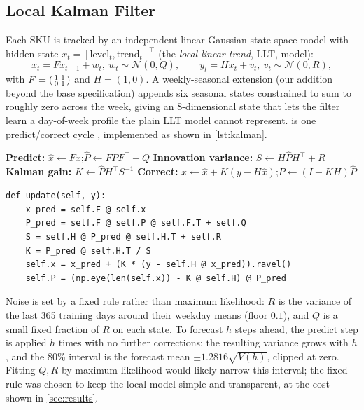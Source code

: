 \documentclass[conference]{IEEEtran}
\begin{document}
\subsection{Local Kalman Filter}
\label{sec:kalman}
Each SKU is tracked by an independent linear-Gaussian state-space model with hidden state
$x_t=[\text{level}_t,\text{trend}_t]^\top$ (the \emph{local linear trend}, LLT, model):
\begin{equation}
  x_t = F x_{t-1} + w_t,\ w_t\sim\mathcal{N}(0,Q), \qquad
  y_t = H x_t + v_t,\ v_t\sim\mathcal{N}(0,R),
  \label{eq:ssm}
\end{equation}
with $F=\begin{psmallmatrix}1&1\\0&1\end{psmallmatrix}$ and $H=(1,0)$. A weekly-seasonal extension
(our addition beyond the base specification) appends six seasonal states constrained to sum to
roughly zero across the week, giving an 8-dimensional state that lets the filter learn a
day-of-week profile the plain LLT model cannot represent.  is one predict/correct
cycle \cite{kalman1960}, implemented as shown in \cref{lst:kalman}.

\begin{algorithm}[t]
\caption{Kalman filter, one time step}
\label{alg:kalman}
\footnotesize
\begin{algorithmic}[1]
\State \textbf{Predict:} $\hat{x}\gets Fx$;\quad $\hat{P}\gets FPF^\top+Q$
\State \textbf{Innovation variance:} $S\gets H\hat{P}H^\top+R$
\State \textbf{Kalman gain:} $K\gets \hat{P}H^\top S^{-1}$
\State \textbf{Correct:} $x\gets \hat{x}+K(y-H\hat{x})$;\quad $P\gets (I-KH)\hat{P}$
\end{algorithmic}
\end{algorithm}

\begin{lstlisting}[caption={One predict/correct step (\texttt{kalman.py}).},label={lst:kalman},float=t]
def update(self, y):
    x_pred = self.F @ self.x
    P_pred = self.F @ self.P @ self.F.T + self.Q
    S = self.H @ P_pred @ self.H.T + self.R
    K = P_pred @ self.H.T / S
    self.x = x_pred + (K * (y - self.H @ x_pred)).ravel()
    self.P = (np.eye(len(self.x)) - K @ self.H) @ P_pred
\end{lstlisting}

Noise is set by a fixed rule rather than maximum likelihood: $R$ is the variance of the last 365
training days around their weekday means (floor $0.1$), and $Q$ is a small fixed fraction of $R$
on each state. To forecast $h$ steps ahead, the predict step is applied $h$ times with no further
corrections; the resulting variance grows with $h$, and the 80\% interval is the forecast mean
$\pm1.2816\sqrt{V(h)}$, clipped at zero. Fitting $Q,R$ by maximum likelihood \cite{durbin2012} would
likely narrow this interval; the fixed rule was chosen to keep the local model simple and
transparent, at the cost shown in \cref{sec:results}.
\end{document}
